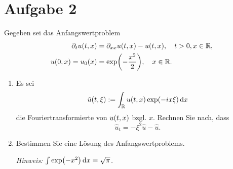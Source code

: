 \documentclass{exercise}
\begin{document}
    \section*{Aufgabe 2}
    
    \begin{problem}
        Gegeben sei das Anfangswertproblem
        \begin{align*}
            \partial_t u\parentheses*{t, x} &= \partial_{xx}u\parentheses*{t, x} - u\parentheses*{t, x}, \quad t > 0, x \in \R,\\
            u\parentheses*{0, x} = u_0\parentheses*{x} &= \exp\parentheses*{-\frac{x^2}{2}}, \quad x \in \R.
        \end{align*}
        \begin{enumerate}
            \item Es sei
            \[
                \hat{u}\parentheses*{t, \xi} := \int_\R u\parentheses*{t, x}\exp\parentheses*{-ix\xi}\d x
            \]
            die Fouriertransformierte von \(u\parentheses*{t, x}\) bzgl. \(x\).
            Rechnen Sie nach, dass
            \[
                \hat{u}_t = -\xi^2 \hat{u} - \hat{u}.
            \]
            \item Bestimmen Sie eine Lösung des Anfangswertproblems.

            \emph{Hinweis: \(\int\exp\parentheses*{-x^2}\d x = \sqrt{\pi}\).}
        \end{enumerate}
    \end{problem}
    
\end{document}
